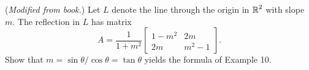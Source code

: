 \documentclass[../main.tex]{subfiles}
\begin{document}
(\emph{Modified from book.})
Let $L$ denote the line through the origin in $\operatorname{\mathbb{R}}^2$ with slope $m$.
The reflection in $L$ has matrix
\[
	A
	=
	\frac{1}{1 + m^2}
	\begin{bmatrix}
		1 - m^2 & 2m \\
		2m & m^2 - 1
	\end{bmatrix}.
\]
Show that $m = \sin\theta/\cos\theta = \tan\theta$ yields the formula of Example 10.
\solution
\end{document}
